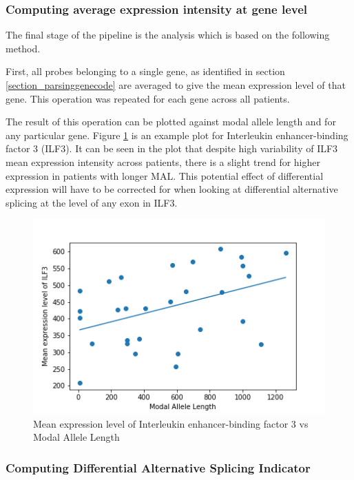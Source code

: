 \subsubsection{Computing average expression intensity at gene level}

The final stage of the pipeline is the analysis which is based on the following method.

First, all probes belonging to a single gene, as identified in section \ref{section_parsinggenecode} are averaged to give the mean expression level of that gene. This operation was repeated for each gene across all patients.

The result of this operation can be plotted against modal allele length and for any particular gene. Figure \ref{avgILF3} is an example plot for Interleukin enhancer-binding factor 3 (ILF3). It can be seen in the plot that despite high variability of ILF3 mean expression intensity across patients, there is a slight trend for higher expression in patients with longer MAL. This potential effect of differential expression will have to be corrected for when looking at differential alternative splicing at the level of any exon in ILF3.

\begin{figure}[ht]
	\centering
	\includegraphics[width=135mm]{avgILF3.png}
	\caption{Mean expression level of Interleukin enhancer-binding factor 3 vs Modal Allele Length}
	\label{avgILF3}
\end{figure}

\subsubsection{Computing Differential Alternative Splicing Indicator} \label{subsection_DASI}

